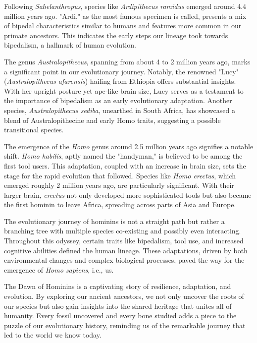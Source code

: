 Following \textit{Sahelanthropus}, species like \textit{Ardipithecus ramidus} emerged around 4.4 million years ago. "Ardi," as the most famous specimen is called, presents a mix of bipedal characteristics similar to humans and features more common in our primate ancestors. This indicates the early steps our lineage took towards bipedalism, a hallmark of human evolution.

The genus \textit{Australopithecus}, spanning from about 4 to 2 million years ago, marks a significant point in our evolutionary journey. Notably, the renowned "Lucy" (\textit{Australopithecus afarensis}) hailing from Ethiopia offers substantial insights. With her upright posture yet ape-like brain size, Lucy serves as a testament to the importance of bipedalism as an early evolutionary adaptation. Another species, \textit{Australopithecus sediba}, unearthed in South Africa, has showcased a blend of Australopithecine and early Homo traits, suggesting a possible transitional species.

The emergence of the \textit{Homo} genus around 2.5 million years ago signifies a notable shift. \textit{Homo habilis}, aptly named the "handyman," is believed to be among the first tool users. This adaptation, coupled with an increase in brain size, sets the stage for the rapid evolution that followed. Species like \textit{Homo erectus}, which emerged roughly 2 million years ago, are particularly significant. With their larger brain, \textit{erectus} not only developed more sophisticated tools but also became the first hominin to leave Africa, spreading across parts of Asia and Europe.

The evolutionary journey of hominins is not a straight path but rather a branching tree with multiple species co-existing and possibly even interacting. Throughout this odyssey, certain traits like bipedalism, tool use, and increased cognitive abilities defined the human lineage. These adaptations, driven by both environmental changes and complex biological processes, paved the way for the emergence of \textit{Homo sapiens}, i.e., us.

The Dawn of Hominins is a captivating story of resilience, adaptation, and evolution. By exploring our ancient ancestors, we not only uncover the roots of our species but also gain insights into the shared heritage that unites all of humanity. Every fossil uncovered and every bone studied adds a piece to the puzzle of our evolutionary history, reminding us of the remarkable journey that led to the world we know today.

